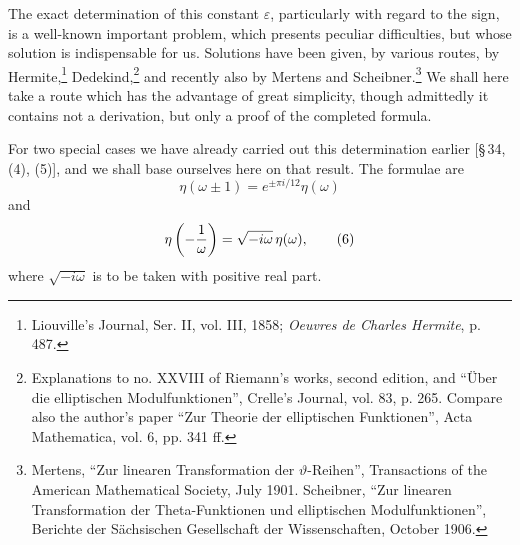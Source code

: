 \documentclass[11pt]{article}
\begin{document}
The exact determination of this constant $\varepsilon$, particularly with regard to the sign, is a well-known important problem, which presents peculiar difficulties, but whose solution is indispensable for us. Solutions have been given, by various routes, by Hermite,\footnote{Liouville's Journal, Ser. II, vol. III, 1858; \emph{Oeuvres de Charles Hermite}, p. 487.} Dedekind,\footnote{Explanations to no. XXVIII of Riemann's works, second edition, and ``Über die elliptischen Modulfunktionen'', Crelle's Journal, vol. 83, p. 265. Compare also the author's paper ``Zur Theorie der elliptischen Funktionen'', Acta Mathematica, vol. 6, pp. 341 ff.} and recently also by Mertens and Scheibner.\footnote{Mertens, ``Zur linearen Transformation der $\vartheta$-Reihen'', Transactions of the American Mathematical Society, July 1901. Scheibner, ``Zur linearen Transformation der Theta-Funktionen und elliptischen Modulfunktionen'', Berichte der Sächsischen Gesellschaft der Wissenschaften, October 1906.} We shall here take a route which has the advantage of great simplicity, though admittedly it contains not a derivation, but only a proof of the completed formula.

For two special cases we have already carried out this determination earlier [\S\,34, (4), (5)], and we shall base ourselves here on that result. The formulae are
\begin{equation}
\eta(\omega\pm1)=e^{\pm\pi i/12}\eta(\omega) 
\tag{5}
\end{equation}
and
\begin{equation}
\eta\left(-{1\over\omega}\right)=\sqrt{-i\omega}\,\eta(\omega),
\tag{6}
\end{equation}
where $\sqrt{-i\omega}$ is to be taken with positive real part.
\end{document}
